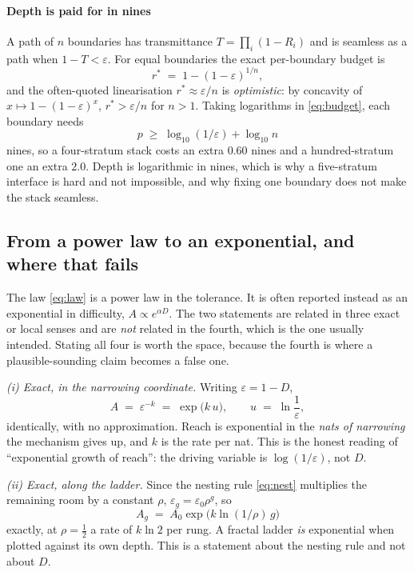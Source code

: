 \documentclass[conference]{IEEEtran}
\theoremstyle{definition}
\begin{document}
\paragraph{Depth is paid for in nines} A path of $n$ boundaries has transmittance
$T=\prod_{i}(1-R_i)$ and is seamless as a path when $1-T<\varepsilon$. For equal
boundaries the exact per-boundary budget is
\begin{equation}
r^{*} \;=\; 1-(1-\varepsilon)^{1/n},
\label{eq:budget}
\end{equation}
and the often-quoted linearisation $r^{*}\approx\varepsilon/n$ is \emph{optimistic}:
by concavity of $x\mapsto 1-(1-\varepsilon)^{x}$, $r^{*}>\varepsilon/n$ for
$n>1$. Taking logarithms in \eqref{eq:budget}, each boundary needs
\begin{equation}
p \;\ge\; \log_{10}\!\left(1/\varepsilon\right) + \log_{10} n
\label{eq:depth}
\end{equation}
nines, so a four-stratum stack costs an extra $0.60$ nines and a hundred-stratum
one an extra $2.0$. Depth is logarithmic in nines, which is why a
five-stratum interface is hard and not impossible, and why fixing one boundary
does not make the stack seamless.

\subsection{From a power law to an exponential, and where that fails}
\label{sec:exponential}

The law \eqref{eq:law} is a power law in the tolerance. It is often reported
instead as an exponential in difficulty, $A\propto e^{\alpha D}$. The two
statements are related in three exact or local senses and are \emph{not} related
in the fourth, which is the one usually intended. Stating all four is worth the
space, because the fourth is where a plausible-sounding claim becomes a false one.

\emph{(i) Exact, in the narrowing coordinate.} Writing $\varepsilon=1-D$,
\begin{equation}
A \;=\; \varepsilon^{-k} \;=\; \exp\!\bigl(k\,u\bigr),
\qquad u \;=\; \ln\frac{1}{\varepsilon},
\label{eq:exp-u}
\end{equation}
identically, with no approximation. Reach is exponential in the \emph{nats of
narrowing} the mechanism gives up, and $k$ is the rate per nat. This is the honest
reading of ``exponential growth of reach'': the driving variable is $\log(1/\varepsilon)$,
not $D$.

\emph{(ii) Exact, along the ladder.} Since the nesting rule
\eqref{eq:nest} multiplies the remaining room by a constant $\rho$,
$\varepsilon_g=\varepsilon_0\rho^{g}$, so
\begin{equation}
A_g \;=\; A_0\exp\!\bigl(k\ln(1/\rho)\,g\bigr)
\label{eq:exp-g}
\end{equation}
exactly, at $\rho=\frac12$ a rate of $k\ln 2$ per rung. A fractal ladder \emph{is}
exponential when plotted against its own depth. This is a statement about the
nesting rule and not about $D$.
\end{document}
